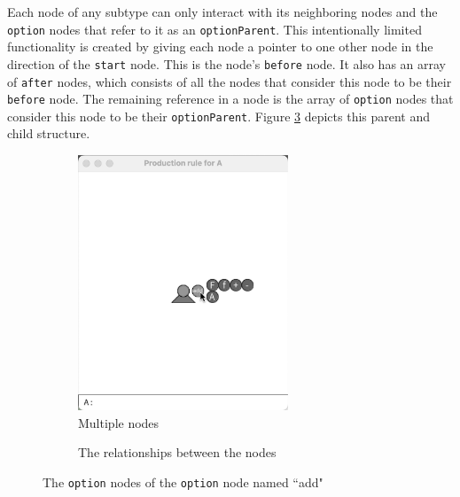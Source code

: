 \documentclass[12pt,twoside]{reedthesis}
\newcommand{\code}[1]{\texttt{#1}}
\begin{document}
	Each node of any subtype can only interact with its neighboring nodes and the \code{option} nodes that refer to it as an \code{optionParent}. This intentionally limited functionality is created by giving each node a pointer to one other node in the direction of the \code{start} node. This is the node's \code{before} node. It also has an array of \code{after} nodes, which consists of all the nodes that consider this node to be their \code{before} node. The remaining reference in a node is the array of \code{option} nodes that consider this node to be their \code{optionParent}. Figure \ref{options} depicts this parent and child structure.
	
	
	\begin{figure}[h]
	\begin{subfigure}{0.5\textwidth}
		\centering
		\includegraphics[height = 3in]{Images/HowItWorks5}
		\caption{Multiple nodes}
		\label {HowItWorks5}
	\end{subfigure}
	\begin{subfigure}{0.5\textwidth}
		\centering
		
		\caption{The relationships between the nodes}
		\label {HowItWorks5B}
	\end{subfigure}
	\caption{The \code{option} nodes of the \code{option} node named ``add"}
	\label{options}
	\end{figure}
	
\end{document}
